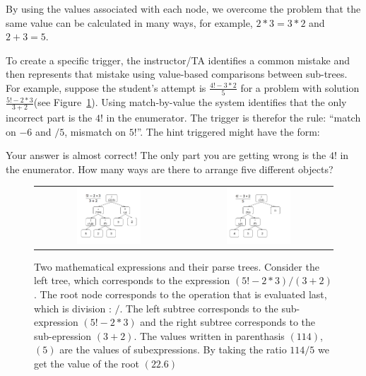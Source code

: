 \documentclass{llncs2e/llncs}
\begin{document}
By using the values associated with each node, we overcome the problem that the same value can be calculated in many ways, for example, $2*3 = 3*2$ and $2+3=5$. 

To create a specific trigger, the instructor/TA identifies a common
mistake and then represents that mistake using value-based comparisons between sub-trees. For example,
suppose the student's attempt is $\frac{4!-3*2}{5}$
for a problem with solution $\frac{5!-2*3}{3+2}$(see Figure~\ref{fig:parse_tree}). Using match-by-value the system identifies that the only incorrect part is the $4!$ in the enumerator. The trigger is therefor the rule: ``match on $-6$ and $/5$, mismatch on $5!$''. The hint triggered might have the form:
\begin{displayquote}
Your answer is almost correct! The only part you are getting wrong is
the $4!$ in the enumerator. How many ways are there to arrange five different objects?
\end{displayquote}


\begin{figure}[ht]
  \centering
   \begin{tabular}{c c}
		\includegraphics[width=0.45\textwidth]{image/ParseTrees1.png} &
		\includegraphics[width=0.45\textwidth]{image/ParseTrees2.png}
	\end{tabular}
   \caption{Two mathematical expressions and their parse
     trees. Consider the left tree, which corresponds to the
     expression $(5!-2*3)/(3+2)$. The root node corresponds to the
     operation that is evaluated last, which is division : $/$. The
     left subtree corresponds to the sub-expression $(5!-2*3)$ and the
     right subtree corresponds to the sub-epression $(3+2)$. The
     values written in parenthasis $(114)$,$(5)$ are the values of
     subexpressions. By taking the ratio $114/5$ we get the value of
     the root $(22.6)$}
   \label{fig:parse_tree}
\end{figure}
\end{document}
